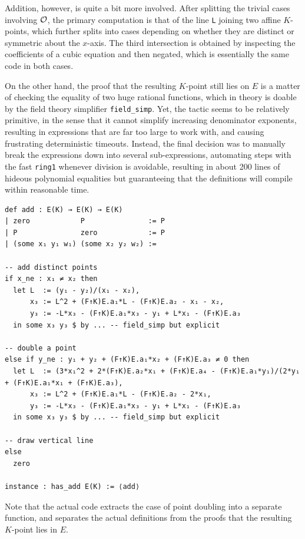 Addition, however, is quite a bit more involved. After splitting the trivial cases involving $ \mathcal{O} $, the primary computation is that of the line \texttt{L} joining two affine $ K $-points, which further splits into cases depending on whether they are distinct or symmetric about the $ x $-axis. The third intersection is obtained by inspecting the coefficients of a cubic equation and then negated, which is essentially the same code in both cases.

On the other hand, the proof that the resulting $ K $-point still lies on $ E $ is a matter of checking the equality of two huge rational functions, which in theory is doable by the field theory simplifier \texttt{field\_simp}. Yet, the tactic seems to be relatively primitive, in the sense that it cannot simplify increasing denominator exponents, resulting in expressions that are far too large to work with, and causing frustrating deterministic timeouts. Instead, the final decision was to manually break the expressions down into several sub-expressions, automating steps with the fast \texttt{ring1} whenever division is avoidable, resulting in about 200 lines of hideous polynomial equalities but guaranteeing that the definitions will compile within reasonable time.

\pagebreak

\begin{lstlisting}[frame=single]
def add : E(K) → E(K) → E(K)
| zero            P               := P
| P               zero            := P
| (some x₁ y₁ w₁) (some x₂ y₂ w₂) :=

-- add distinct points
if x_ne : x₁ ≠ x₂ then
  let L  := (y₁ - y₂)/(x₁ - x₂),
      x₃ := L^2 + (F↑K)E.a₁*L - (F↑K)E.a₂ - x₁ - x₂,
      y₃ := -L*x₃ - (F↑K)E.a₁*x₃ - y₁ + L*x₁ - (F↑K)E.a₃
  in some x₃ y₃ $ by ... -- field_simp but explicit

-- double a point
else if y_ne : y₁ + y₂ + (F↑K)E.a₁*x₂ + (F↑K)E.a₃ ≠ 0 then
  let L  := (3*x₁^2 + 2*(F↑K)E.a₂*x₁ + (F↑K)E.a₄ - (F↑K)E.a₁*y₁)/(2*y₁ + (F↑K)E.a₁*x₁ + (F↑K)E.a₃),
      x₃ := L^2 + (F↑K)E.a₁*L - (F↑K)E.a₂ - 2*x₁,
      y₃ := -L*x₃ - (F↑K)E.a₁*x₃ - y₁ + L*x₁ - (F↑K)E.a₃
  in some x₃ y₃ $ by ... -- field_simp but explicit

-- draw vertical line
else
  zero

instance : has_add E(K) := ⟨add⟩
\end{lstlisting}

Note that the actual code extracts the case of point doubling into a separate function, and separates the actual definitions from the proofs that the resulting $ K $-point lies in $ E $.

